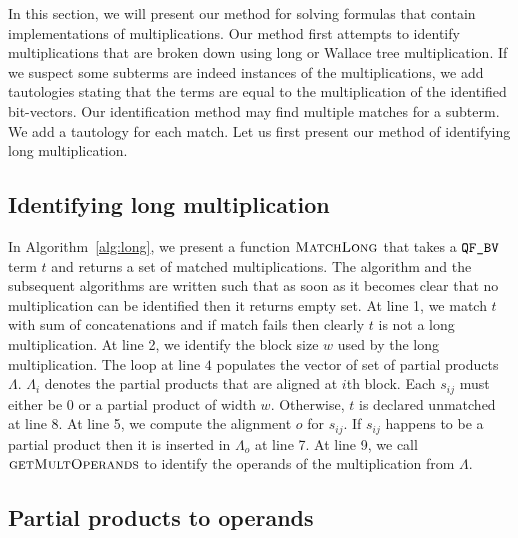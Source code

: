 %
In this section, we will present our method for solving
formulas that contain implementations of multiplications.
%
Our method first attempts to identify multiplications that
are broken down using long or Wallace tree multiplication.
%
If we suspect some subterms are indeed instances of the
multiplications, we add tautologies stating that the terms are 
equal to the multiplication of the identified bit-vectors.
%
Our identification method may find multiple matches for a subterm.
%
We add a tautology for each match.
%
Let us first present our method of identifying long multiplication. 


\subsection{Identifying long multiplication}


In Algorithm~\ref{alg:long}, we present a function $\textsc{MatchLong}$
that takes a $\texttt{QF\_BV}$ term $t$ and returns a set of matched multiplications.
%
The algorithm and the subsequent algorithms are written such that as soon
as it becomes clear that no multiplication can be identified then
it returns empty set. 
%
At line 1, we match $t$ with sum of concatenations and if match fails
then clearly $t$ is not a long multiplication.
%
At line 2, we identify the block size $w$ used by the long
multiplication.
%
The loop at line $4$ populates the vector of set of partial products $\Lambda$.
%
$\Lambda_i$ denotes the partial products that are aligned at $i$th block.
%
Each $s_{ij}$ must either be $0$ or a partial product of width $w$.
%
Otherwise, $t$ is declared unmatched at line 8. 
%
At line 5, we compute the alignment $o$ for $s_{ij}$.
%
If $s_{ij}$ happens to be a partial product then it is inserted in
$\Lambda_o$ at line 7.
%
At line 9, we call $\textsc{getMultOperands}$ to identify the operands
of the multiplication from $\Lambda$.

\subsection{Partial products to operands}


